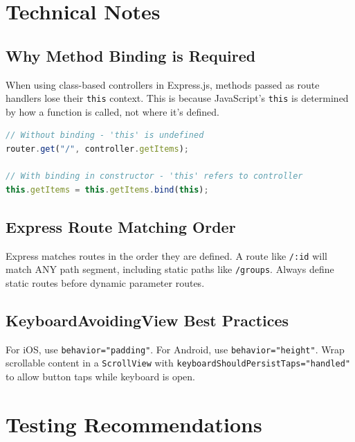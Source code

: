 \documentclass[11pt,a4paper]{article}
\begin{document}
\section{Technical Notes}

\subsection{Why Method Binding is Required}

When using class-based controllers in Express.js, methods passed as route handlers lose their \texttt{this} context. This is because JavaScript's \texttt{this} is determined by how a function is called, not where it's defined.

\begin{lstlisting}[language=JavaScript]
// Without binding - 'this' is undefined
router.get("/", controller.getItems);

// With binding in constructor - 'this' refers to controller
this.getItems = this.getItems.bind(this);
\end{lstlisting}

\subsection{Express Route Matching Order}

Express matches routes in the order they are defined. A route like \texttt{/:id} will match ANY path segment, including static paths like \texttt{/groups}. Always define static routes before dynamic parameter routes.

\subsection{KeyboardAvoidingView Best Practices}

For iOS, use \texttt{behavior="padding"}. For Android, use \texttt{behavior="height"}. Wrap scrollable content in a \texttt{ScrollView} with \texttt{keyboardShouldPersistTaps="handled"} to allow button taps while keyboard is open.

\section{Testing Recommendations}
\end{document}
